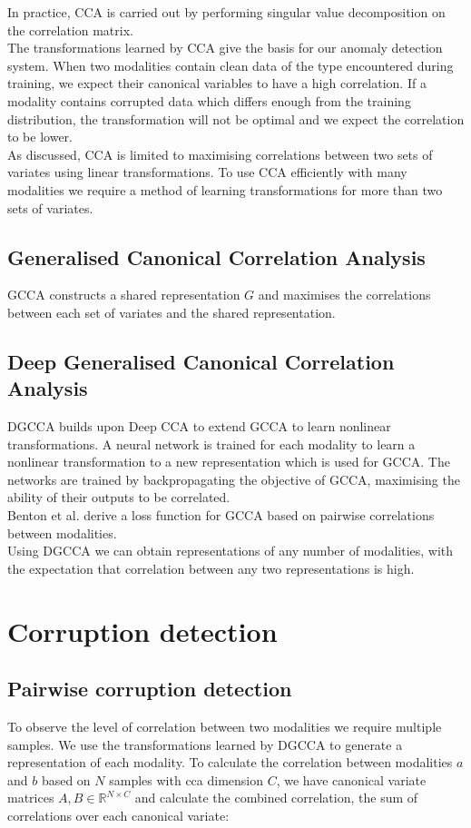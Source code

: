 In practice, CCA is carried out by performing singular value decomposition on the correlation matrix. \\

The transformations learned by CCA give the basis for our anomaly detection system. When two modalities contain clean data of the type encountered during training, we expect their canonical variables to have a high correlation. If a modality contains corrupted data which differs enough from the training distribution, the transformation will not be optimal and we expect the correlation to be lower.\\

As discussed, CCA is limited to maximising correlations between two sets of variates using linear transformations. To use CCA efficiently with many modalities we require a method of learning transformations for more than two sets of variates.

\subsection{Generalised Canonical Correlation Analysis}
GCCA \cite{GCCA} constructs a shared representation $G$ and maximises the correlations between each set of variates and  the shared representation.

\subsection{Deep Generalised Canonical Correlation Analysis}
DGCCA builds upon Deep CCA \cite{DCCA} to extend GCCA to learn nonlinear transformations. A neural network is trained for each modality to learn a nonlinear transformation to a new representation which is used for GCCA. The networks are trained by backpropagating the objective of GCCA, maximising the ability of their outputs to be correlated.\\

Benton et al. \cite{DGCCA} derive a loss function for GCCA based on pairwise correlations between modalities.\\

Using DGCCA we can obtain representations of any number of modalities, with the expectation that correlation between any two representations is high.

\section{Corruption detection}
\subsection{Pairwise corruption detection}
To observe the level of correlation between two modalities we require multiple samples. We use the transformations learned by DGCCA to generate a representation of each modality. To calculate the correlation between modalities $a$ and $b$ based on $N$ samples with cca dimension $C$, we have canonical variate matrices $A, B \in \mathbb{R}^{N\times C}$ and calculate the combined correlation, the sum of correlations over each canonical variate:

